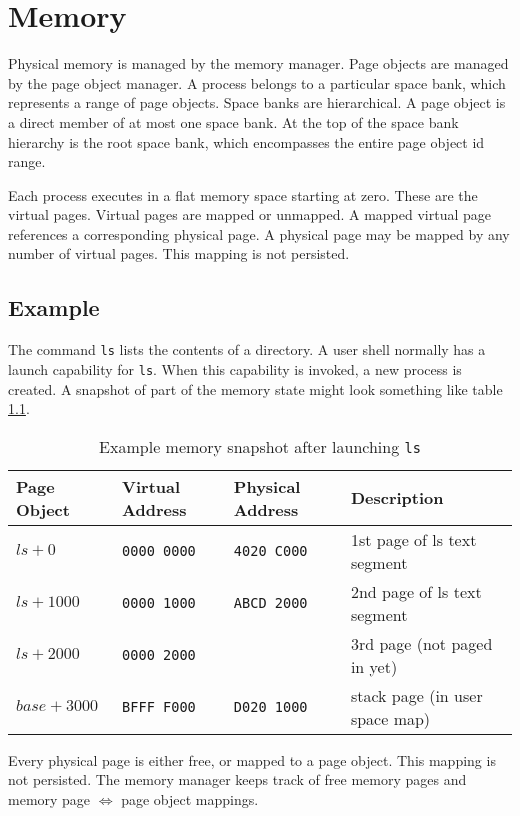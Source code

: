 \chapter{Memory}

Physical memory is managed by the memory manager.  Page objects are managed by the page object manager.  A process belongs to a particular space bank, which represents a range of page objects.  Space banks are hierarchical.  A page object is a direct member of at most one space bank.  At the top of the space bank hierarchy is the root space bank, which encompasses the entire page object id range.

Each process executes in a flat memory space starting at zero.  These are the virtual pages.  Virtual pages are mapped or unmapped.  A mapped virtual page references a corresponding physical page.  A physical page may be mapped by any number of virtual pages.  This mapping is not persisted.

\section{Example}

The command {\tt ls} lists the contents of a directory.  A user shell normally has a launch capability for {\tt ls}.  When this capability is invoked, a new process is created.  A snapshot of part of the memory state might look something like table \ref{table:ls-launch}.

\begin{table}[ht]
\begin{tabular}{l l l l}
\hline\hline
Page Object & Virtual Address & Physical Address & Description \\
\hline
$ls + 0$ & {\tt 0000 0000} & {\tt 4020 C000} & 1st page of ls text segment \\
$ls + 1000$ & {\tt 0000 1000} & {\tt ABCD 2000} & 2nd page of ls text segment \\
$ls + 2000$ & {\tt 0000 2000} &  & 3rd page (not paged in yet) \\
$base + 3000$ & {\tt BFFF F000} & {\tt D020 1000} & stack page (in user space map) \\
\hline
\end{tabular}
\caption{Example memory snapshot after launching {\tt ls}}
\label{table:ls-launch}
\end{table}

Every physical page is either free, or mapped to a page object.  This mapping is not persisted.  The memory manager keeps track of free memory pages and memory page $\Leftrightarrow$ page object mappings.

